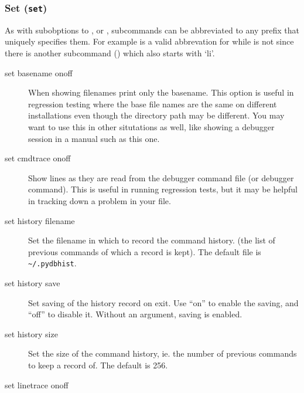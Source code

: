 \subsubsection{Set ({\tt set})\label{subsubsection-set}}

As with subobptions to , or , 
subcommands can be abbreviated to any prefix that uniquely
specifies them. For example  is a valid abbrevation for
 while  is not since there is another
subcommand () which also starts with `li'.


\begin{description}

\item[set basename on\code{\Large{|}}off]\label{command:basename}

When showing filenames print only the basename. This option is useful
in regression testing where the base file names are the same
on different installations even though the directory path may
be different. You may want to use this in other
situtations as well, like showing a debugger session in a manual
such as this one. 

\item[set cmdtrace on\code{\Large{|}}off]\label{command:cmdtrace}
 
Show lines as they are read from the debugger command file (or
 debugger command). This is useful in running
regression tests, but it may be helpful in tracking down a problem in
your  file.

\item[set history filename ]\label{command:hist-filename}

Set the filename in which to record the command history.
(the list of previous commands of which a record is kept). The default
file is \verb|~/.pydbhist|.

\item[set history save]

Set saving of the history record on exit.  Use ``on'' to enable the
saving, and ``off'' to disable it.  Without an argument, saving is
enabled.

\item[set history size]

Set the size of the command history, ie. the number of previous
commands to keep a record of. The default is 256.

\item[set linetrace on\code{\Large{|}}off]\label{command:linetrace}


\end{description}
